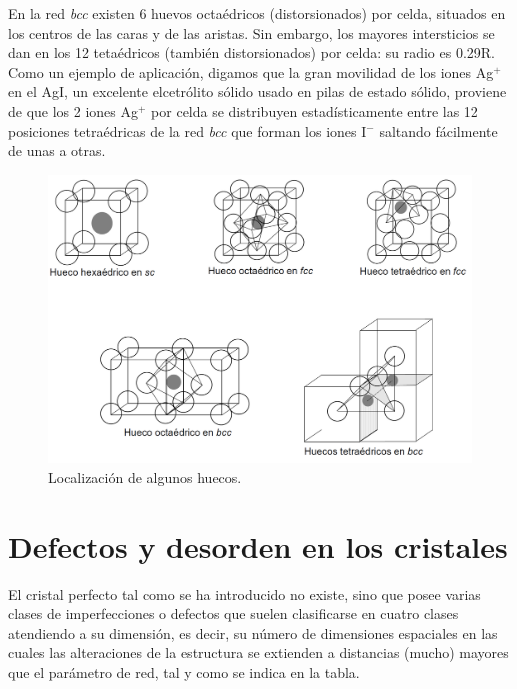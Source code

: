 En la red {\it bcc} existen 6 huevos octaédricos (distorsionados) por celda, situados en los centros de las caras y de las aristas. Sin embargo, los mayores intersticios se dan en los 12 tetaédricos (también distorsionados) por celda: su radio es 0.29R. Como un ejemplo de aplicación, digamos que la gran movilidad de los iones Ag$^+$ en el AgI, un excelente elcetrólito sólido usado en pilas de estado sólido, proviene de que los 2 iones Ag$^+$ por celda se distribuyen estadísticamente entre las 12 posiciones tetraédricas de la red {\it bcc} que forman los iones I$^-$ saltando fácilmente de unas a otras.


\begin{figure}[h!] \centering
    \includegraphics[scale=0.4]{Cuerpo/Ch_01/huecos.png}
    \caption{Localización de algunos huecos.}
    \label{Fig:01-05}
\end{figure}



\section{Defectos y desorden en los cristales}

El cristal perfecto tal como se ha introducido no existe, sino que posee varias clases de imperfecciones o defectos que suelen clasificarse en cuatro clases atendiendo a su dimensión, es decir, su número de dimensiones espaciales en las cuales las alteraciones de la estructura se extienden a distancias (mucho) mayores que el parámetro de red, tal y como se indica en la tabla.


